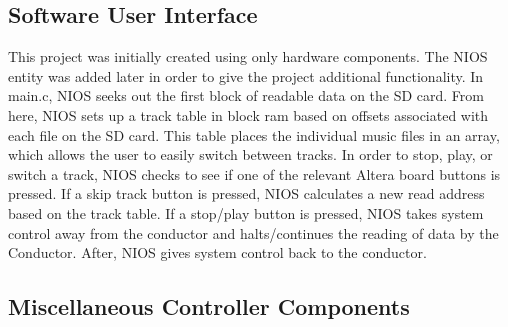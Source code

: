 \documentclass{article}
\begin{document}

\subsection{Software User Interface}
This project was initially created using only hardware components. The NIOS entity was added later in order to give the project additional functionality. In main.c, NIOS seeks out the first block of readable data on the SD card. From here, NIOS sets up a track table in block ram based on offsets associated with each file on the SD card. This table places the individual music files in an array, which allows the user to easily switch between tracks. In order to stop, play, or switch a track, NIOS checks to see if one of the relevant Altera board buttons is pressed. If a skip track button is pressed, NIOS calculates a new read address based on the track table. If a stop/play button is pressed, NIOS takes system control away from the conductor and halts/continues the reading of data by the Conductor. After, NIOS gives system control back to the conductor. 
\subsection{Miscellaneous Controller Components}
\end{document}
